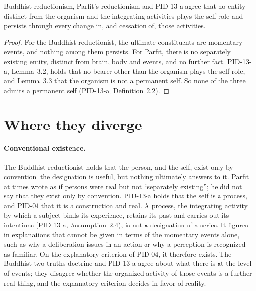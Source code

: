 \documentclass{situationist-preprint}
\begin{document}
\begin{proposition}\label{p:common}
Buddhist reductionism, Parfit's reductionism and PID-13-a agree that no entity distinct from the organism and the integrating activities plays the self-role and persists through every change in, and cessation of, those activities.
\end{proposition}

\begin{proof}
For the Buddhist reductionist, the ultimate constituents are momentary events, and nothing among them persists. For Parfit, there is no separately existing entity, distinct from brain, body and events, and no further fact. PID-13-a, Lemma~3.2, holds that no bearer other than the organism plays the self-role, and Lemma~3.3 that the organism is not a permanent self. So none of the three admits a permanent self (PID-13-a, Definition~2.2).
\end{proof}

\section{Where they diverge}

\paragraph{Conventional existence.} The Buddhist reductionist holds that the person, and the self, exist only by convention: the designation is useful, but nothing ultimately answers to it. Parfit at times wrote as if persons were real but not \enquote{separately existing}; he did not say that they exist only by convention. PID-13-a holds that the self is a process, and PID-04 that it is a construction and real. A process, the integrating activity by which a subject binds its experience, retains its past and carries out its intentions (PID-13-a, Assumption~2.4), is not a designation of a series. It figures in explanations that cannot be given in terms of the momentary events alone, such as why a deliberation issues in an action or why a perception is recognized as familiar. On the explanatory criterion of PID-04, it therefore exists. The Buddhist two-truths doctrine and PID-13-a agree about what there is at the level of events; they disagree whether the organized activity of those events is a further real thing, and the explanatory criterion decides in favor of reality.
\end{document}
